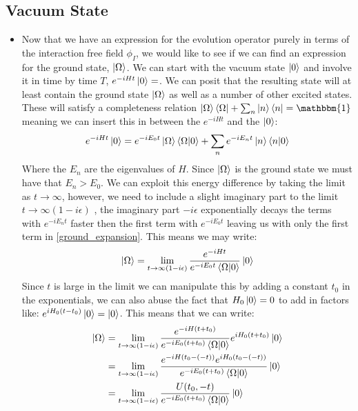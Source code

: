 \documentclass[11pt]{article}
\numberwithin{equation}{section}
\begin{document}
\subsection{Vacuum State} %
\label{sub:vacuum_state}
\begin{itemize}
  \item Now that we have an expression for the evolution operator purely in terms of the interaction free field $\phi_I$, we would like to see if we can find an expression for the ground state, $\ket{\Omega}$. We can start with the vacuum state $\ket{0}$ and involve it in time by time $T$, $e^{-iHt}\ket{0}=$. We can posit that the resulting state will at least contain the ground state $\ket{\Omega}$ as well as a number of other excited states. These will satisfy a completeness relation $\ket{\Omega}\bra{\Omega} + \sum_{n}\ket{n}\bra{n} = \mathbbm{1}$ meaning we can insert this in between the $e^{-iHt}$ and the $\ket{0}$:
  \begin{align}
  \label{ground_expansion}
    e^{-iHt}\ket{0}=e^{-iE_0t}\ket{\Omega}\braket{\Omega|0} + \sum_{n}e^{-iE_nt}\ket{n}\braket{n|0}
  \end{align}
  Where the $E_n$ are the eigenvalues of $H$. Since $\ket{\Omega}$ is the ground state we must have that $E_n>E_0$. We can exploit this energy difference by taking the limit as $t \rightarrow \infty$, however, we need to include a slight imaginary part to the limit $t \rightarrow \infty(1-i\epsilon)$ , the imaginary part $-i\epsilon$ exponentially decays the terms with $e^{-iE_nt}$ faster then the first term with $e^{-iE_0t}$  leaving us with only the first term in \ref{ground_expansion}. This means we may write:
  \begin{align*}
    \ket{\Omega} = \lim_{t\rightarrow\infty(1-i\epsilon)}\frac{e^{-iHt}}{e^{-iE_0t}\braket{\Omega|0}}\ket{0}
  \end{align*}
  Since $t$ is large in the limit we can manipulate this by adding a constant $t_0$ in the exponentials, we can also abuse the fact that $H_0\ket{0} = 0$ to add in factors like: $e^{iH_0(t-t_0)}\ket{0} = \ket{0}$. This means that we can write:
  \begin{align*}
    \ket{\Omega} & = \lim_{t\rightarrow\infty(1-i\epsilon)}\frac{e^{-iH(t+t_0)}}{e^{-iE_0(t+t_0)}\braket{\Omega|0}}e^{iH_0(t+t_0)}\ket{0} \\
    & =  \lim_{t\rightarrow\infty(1-i\epsilon)}\frac{e^{-iH(t_0-(-t))}e^{iH_0(t_0-(-t))}}{e^{-iE_0(t+t_0)}\braket{\Omega|0}}\ket{0} \\
    & = \lim_{t\rightarrow\infty(1-i\epsilon)}\frac{U(t_0,-t)}{e^{-iE_0(t+t_0)}\braket{\Omega|0}}\ket{0}

\end{align*}
\end{itemize}
\end{document}
